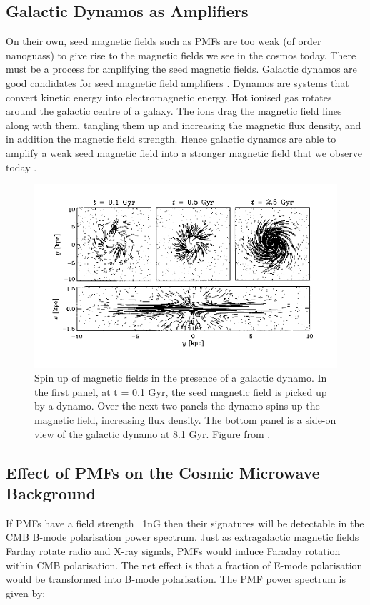 \subsection{Galactic Dynamos as Amplifiers}
On their own, seed magnetic fields such as PMFs are too weak (of order nanoguass) to give rise to the magnetic fields we see in the cosmos today. There must be a process for amplifying the seed magnetic fields. Galactic dynamos are good candidates for seed magnetic field amplifiers \cite{beck}. Dynamos are systems that convert kinetic energy into electromagnetic energy. Hot ionised gas rotates around the galactic centre of a galaxy. The ions drag the magnetic field lines along with them, tangling them up and increasing the magnetic flux density, and in addition the magnetic field strength. Hence galactic dynamos are able to amplify a weak seed magnetic field into a stronger magnetic field that we observe today \cite{Subramanian:2008tt}.

\begin{figure}[ht]
\centering
\includegraphics[scale=1]{images/dynamos_beck.png}
\caption{Spin up of magnetic fields in the presence of a galactic dynamo. In the first panel, at t = 0.1 Gyr, the seed magnetic field is picked up by a dynamo. Over the next two panels the dynamo spins up the magnetic field, increasing flux density. The bottom panel is a side-on view of the galactic dynamo at 8.1 Gyr. Figure from \cite{beck}.}
\end{figure}

\subsection{Effect of PMFs on the Cosmic Microwave Background}
If PMFs have a field strength ~1nG then their signatures will be detectable in the CMB B-mode polarisation power spectrum. Just as extragalactic magnetic fields Farday rotate radio and X-ray signals, PMFs would induce Faraday rotation within CMB polarisation. The net effect is that a fraction of E-mode polarisation would be transformed into B-mode polarisation. 
The PMF power spectrum is given by:

